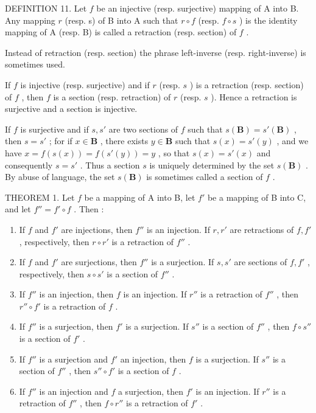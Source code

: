 DEFINITION 11. Let \(f\) be an injective (resp. surjective) mapping of A into B. Any mapping \(r\) (resp. s) of B into A such that \(r \circ f\) (resp. \(f \circ s\) ) is the identity mapping of A (resp. B) is called a retraction (resp. section) of \(f\) .

Instead of retraction (resp. section) the phrase left-inverse (resp. right-inverse) is sometimes used.

If \(f\) is injective (resp. surjective) and if \(r\) (resp. \(s\) ) is a retraction (resp. section) of \(f\) , then \(f\) is a section (resp. retraction) of \(r\) (resp. \(s\) ). Hence a retraction is surjective and a section is injective.

If \(f\) is surjective and if \(s, s'\) are two sections of \(f\) such that \(s(\mathbf{B}) = s'(\mathbf{B})\) , then \(s = s'\) ; for if \(x \in \mathbf{B}\) , there exists \(y \in \mathbf{B}\) such that \(s(x) = s'(y)\) , and we have \(x = f(s(x)) = f(s'(y)) = y\) , so that \(s(x) = s'(x)\) and consequently \(s = s'\) . Thus a section \(s\) is uniquely determined by the set \(s(\mathbf{B})\) . By abuse of language, the set \(s(\mathbf{B})\) is sometimes called a section of \(f\) .

THEOREM 1. Let \(f\) be a mapping of A into B, let \(f'\) be a mapping of B into C, and let \(f'' = f' \circ f\) . Then :

\begin{enumerate}
\def\labelenumi{(\alph{enumi})}
\item
  If \(f\) and \(f'\) are injections, then \(f''\) is an injection. If \(r, r'\) are retractions of \(f, f'\) , respectively, then \(r \circ r'\) is a retraction of \(f''\) .
\item
  If \(f\) and \(f'\) are surjections, then \(f''\) is a surjection. If \(s, s'\) are sections of \(f, f'\) , respectively, then \(s \circ s'\) is a section of \(f''\) .
\item
  If \(f''\) is an injection, then \(f\) is an injection. If \(r''\) is a retraction of \(f''\) , then \(r'' \circ f'\) is a retraction of \(f\) .
\item
  If \(f''\) is a surjection, then \(f'\) is a surjection. If \(s''\) is a section of \(f''\) , then \(f \circ s''\) is a section of \(f'\) .
\item
  If \(f''\) is a surjection and \(f'\) an injection, then \(f\) is a surjection. If \(s''\) is a section of \(f''\) , then \(s'' \circ f'\) is a section of \(f\) .
\item
  If \(f''\) is an injection and \(f\) a surjection, then \(f'\) is an injection. If \(r''\) is a retraction of \(f''\) , then \(f \circ r''\) is a retraction of \(f'\) .
\end{enumerate}

